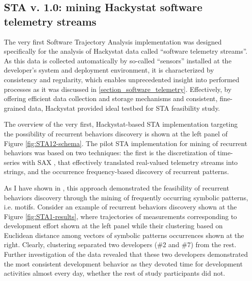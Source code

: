 \subsection{STA v. 1.0: mining Hackystat software telemetry streams}
The very first Software Trajectory Analysis implementation was designed specifically for the analysis of Hackystat 
data called ``software telemetry streams''. As this data is collected automatically by so-called ``sensors'' installed 
at the developer's system and deployment environment, it is characterized by consistency and regularity, which enables 
unprecedented insight into performed processes as it was discussed in \ref{section_software_telemetry}. 
Effectively, by offering efficient data collection and storage mechanisms and consistent, fine-grained data, 
Hackystat provided ideal testbed for STA feasibility study.

The overview of the very first, Hackystat-based STA implementation targeting the possibility of recurrent behaviors 
discovery is shown at the left panel of Figure  \ref{fig:STA12-schema}.
The pilot STA implementation for mining of recurrent behaviors was based on two techniques: the first is the discretization 
of time-series with SAX \cite{sax}, that effectively translated real-valued telemetry streams into strings, and the 
occurrence frequency-based discovery of recurrent patterns.

As I have shown in \cite{csdl2-10-09}, this approach demonstrated the feasibility of recurrent behaviors discovery 
through the mining of frequently occurring symbolic patterns, i.e. motifs. 
Consider an example of recurrent behaviors discovery shown at the Figure \ref{fig:STA1-results}, where trajectories of 
measurements corresponding to development effort shown at the left panel while their clustering based on Euclidean 
distance among vectors of symbolic patterns occurrences shown at the right. Clearly, clustering separated two 
developers (\#2 and \#7) from the rest. Further investigation of the data revealed that these two developers 
demonstrated the most consistent development behavior as they devoted time for development activities almost every day, 
whether the rest of study participants did not.

